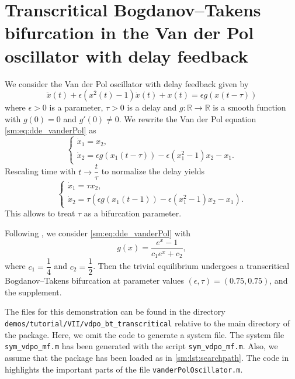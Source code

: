 \section[the Van der Pol oscillator with delay feedback]
        {Transcritical Bogdanov--Takens bifurcation in the Van der Pol oscillator with delay feedback}
We consider the Van der Pol oscillator with delay feedback \cite{jiang2007bogdanov}
given by 
\begin{equation}
\ddot{x}(t) + \epsilon(x^2(t)-1)\dot{x}(t) + x(t) = \epsilon g(x(t-\tau))\label{sm:eq:dde_vanderPol}
\end{equation}
where $\epsilon>0$ is a parameter, $\tau>0$ is a delay and $g:\mathbb{R}\rightarrow\mathbb{R}$
is a smooth function with $g(0) = 0$ and $g'(0)\neq0$. We rewrite
the Van der Pol equation \cref{sm:eq:dde_vanderPol} as
\begin{equation}
\label{sm:eq:vanderPolOscillator}
\begin{cases}
    \dot{x}_1 = x_2,\\
    \dot{x}_2 = \epsilon g(x_1(t-\tau))-\epsilon(x_1^2-1)x_2-x_1.
\end{cases}
\end{equation}
Rescaling time with $t\rightarrow\dfrac{t}{\tau}$ to normalize the
delay yields
\begin{equation}
\label{sm:eq:vanderPolOscillatorRescaled}
\begin{cases}
\dot{x}_1 = \tau x_2,\\
\dot{x}_2 = \tau\left(\epsilon g(x_1(t-1))-\epsilon(x_1^2-1)x_2-x_1\right).
\end{cases}
\end{equation}
This allows to treat $\tau$ as a bifurcation parameter.

Following \cite{jiang2007bogdanov}, we consider \cref{sm:eq:dde_vanderPol} with
\[
g(x) = \frac{e^x-1}{c_1e^x + c_2},
\]
where $c_1 = \dfrac{1}{4}$ and $c_2 = \dfrac{1}{2}$. Then the trivial
equilibrium undergoes a transcritical Bogdanov--Takens bifurcation at parameter
values $(\epsilon,\tau) = (0.75,0.75)$, \cite{jiang2007bogdanov} and the
supplement. 

\begin{remark}
    The \MATLAB files for this demonstration can be found in the directory
    \texttt{demos/tutorial/VII/vdpo_bt_transcritical} relative to the main
    directory of the \DDEBIFTOOL package. Here, we omit the code to generate a
    system file. The system file \texttt{sym_vdpo_mf.m} has been generated
    with the script \texttt{sym_vdpo_mf.m}. Also, we assume that the
    \DDEBIFTOOL package has been loaded as in \cref{sm:lst:searchpath}. The
    code in
    highlights the important parts of the file
    \texttt{vanderPolOscillator.m}. 
\end{remark}

